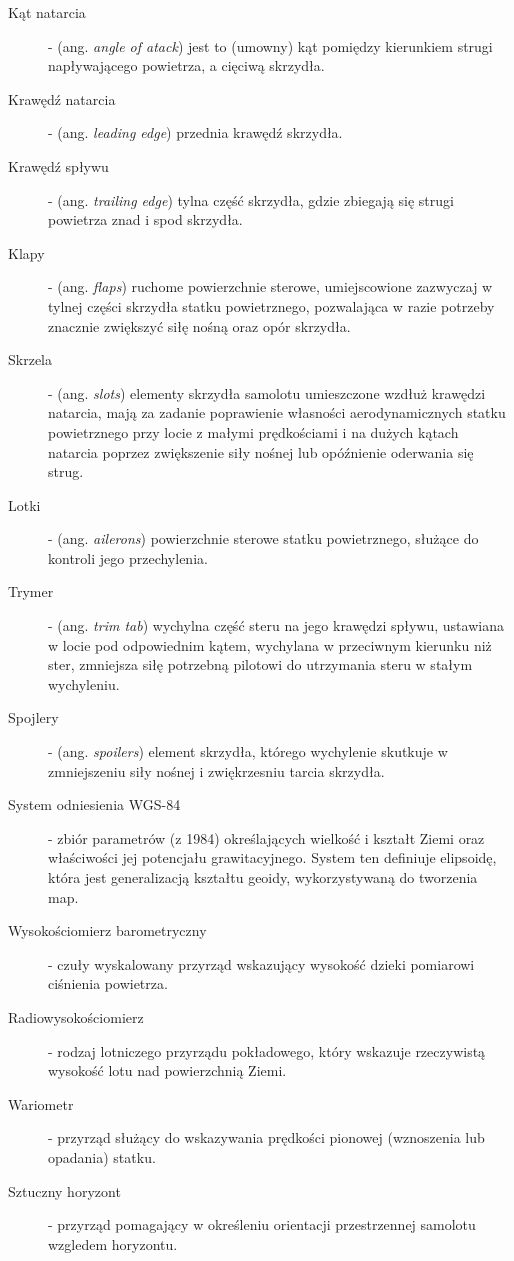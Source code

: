 \documentclass{mwrep}
\begin{document}
\begin{description}
\item[Kąt natarcia] - (ang. \emph{angle of atack}) jest to (umowny) kąt pomiędzy kierunkiem strugi napływającego powietrza, a cięciwą skrzydła.
\item[Krawędź natarcia] - (ang. \emph{leading edge}) przednia krawędź skrzydła.
\item[Krawędź spływu] - (ang. \emph{trailing edge}) tylna część skrzydła, gdzie zbiegają się strugi powietrza znad i spod skrzydła.
\item[Klapy] - (ang. \emph{flaps}) ruchome powierzchnie sterowe, umiejscowione zazwyczaj w tylnej części skrzydła statku powietrznego, pozwalająca w razie potrzeby znacznie zwiększyć siłę nośną oraz opór skrzydła.
\item[Skrzela] - (ang. \emph{slots}) elementy skrzydła samolotu umieszczone wzdłuż krawędzi natarcia, mają za zadanie poprawienie własności aerodynamicznych statku powietrznego przy locie z małymi prędkościami i na dużych kątach natarcia poprzez zwiększenie siły nośnej lub opóźnienie oderwania się strug.
\item[Lotki] - (ang. \emph{ailerons}) powierzchnie sterowe statku powietrznego, służące do kontroli jego przechylenia.
\item[Trymer] - (ang. \emph{trim tab}) wychylna część steru na jego krawędzi spływu, ustawiana w locie pod odpowiednim kątem, wychylana w przeciwnym kierunku niż ster, zmniejsza siłę potrzebną pilotowi do utrzymania steru w stałym wychyleniu.
\item[Spojlery] - (ang. \emph{spoilers}) element skrzydła, którego wychylenie skutkuje w zmniejszeniu siły nośnej i zwiękrzesniu tarcia skrzydła.
\item[System odniesienia WGS-84] - zbiór parametrów (z 1984) określających wielkość i kształt Ziemi oraz właściwości jej potencjału grawitacyjnego. System ten definiuje elipsoidę, która jest generalizacją kształtu geoidy, wykorzystywaną do tworzenia map.
\item[Wysokościomierz barometryczny] - czuły wyskalowany przyrząd wskazujący wysokość dzieki pomiarowi ciśnienia powietrza.
\item[Radiowysokościomierz] - rodzaj lotniczego przyrządu pokładowego, który wskazuje rzeczywistą wysokość lotu nad powierzchnią Ziemi.
\item[Wariometr] - przyrząd służący do wskazywania prędkości pionowej (wznoszenia lub opadania) statku.
\item[Sztuczny horyzont] - przyrząd pomagający w określeniu orientacji przestrzennej samolotu wzgledem horyzontu.

\end{description}
\end{document}
